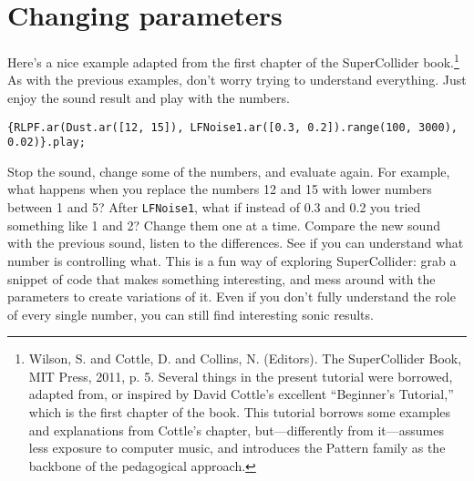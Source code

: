 \section{Changing parameters}

Here's a nice example adapted from the first chapter of the SuperCollider book.\footnote{
Wilson, S. and Cottle, D. and Collins, N. (Editors). The SuperCollider Book, MIT Press, 2011, p. 5. Several things in the present tutorial were borrowed, adapted from, or inspired by David Cottle's excellent ``Beginner's Tutorial,'' which is the first chapter of the book. This tutorial borrows some examples and explanations from Cottle's chapter, but---differently from it---assumes less exposure to computer music, and introduces the Pattern family as the backbone of the pedagogical approach.
} As with the previous examples, don't worry trying to understand everything. Just enjoy the sound result and play with the numbers.

\begin{lstlisting}[style=SuperCollider-IDE, basicstyle=\scttfamily\footnotesize]
{RLPF.ar(Dust.ar([12, 15]), LFNoise1.ar([0.3, 0.2]).range(100, 3000), 0.02)}.play;
\end{lstlisting}

Stop the sound, change some of the numbers, and evaluate again. For example, what happens when you replace the numbers 12 and 15 with lower numbers between 1 and 5? After \texttt{LFNoise1}, what if instead of 0.3 and 0.2 you tried something like 1 and 2? Change them one at a time. Compare the new sound with the previous sound, listen to the differences. See if you can understand what number is controlling what. This is a fun way of exploring SuperCollider: grab a snippet of code that makes something interesting, and mess around with the parameters to create variations of it. Even if you don't fully understand the role of every single number, you can still find interesting sonic results.

\bigskip 
{}